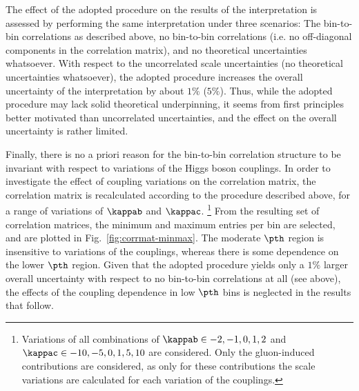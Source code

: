The effect of the adopted procedure on the results of the interpretation is assessed by performing the same interpretation under three scenarios: The bin-to-bin correlations as described above, no bin-to-bin correlations (i.e. no off-diagonal components in the correlation matrix), and no theoretical uncertainties whatsoever.
% 
With respect to the uncorrelated scale uncertainties (no theoretical uncertainties whatsoever), the adopted procedure increases the overall uncertainty of the interpretation by about $1\%$ ($5\%$).
% 
Thus, while the adopted procedure may lack solid theoretical underpinning, it seems from first principles better motivated than uncorrelated uncertainties, and the effect on the overall uncertainty is rather limited.


Finally, there is no a priori reason for the bin-to-bin correlation structure to be invariant with respect to variations of the Higgs boson couplings.
% 
In order to investigate the effect of coupling variations on the correlation matrix, the correlation matrix is recalculated according to the procedure described above, for a range of variations of $\kappab$ and $\kappac$.%
% 
\footnote{%
Variations of all combinations of $\kappab \in -2, -1, 0, 1, 2$ and $\kappac \in -10, -5, 0, 1, 5, 10$ are considered.
% 
Only the gluon-induced contributions are considered, as only for these contributions the scale variations are calculated for each variation of the couplings.
}
% 
From the resulting set of correlation matrices, the minimum and maximum entries per bin are selected, and are plotted in Fig.~\ref{fig:corrmat-minmax}.
% 
The moderate $\pth$ region is insensitive to variations of the couplings, whereas there is some dependence on the lower $\pth$ region.
% 
Given that the adopted procedure yields only a $1\%$ larger overall uncertainty with respect to no bin-to-bin correlations at all (see above), the effects of the coupling dependence in low $\pth$ bins is neglected in the results that follow.


